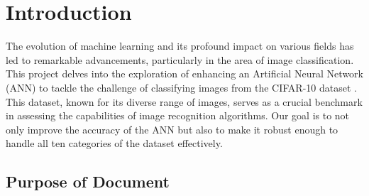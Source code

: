 \documentclass[12pt]{article}
\begin{document}


\section{Introduction}

The evolution of machine learning and its profound impact on various fields has led to remarkable advancements, 
particularly in the area of image classification. This project delves into the exploration of enhancing an 
Artificial Neural Network (ANN) to tackle the challenge of classifying images from the CIFAR-10 dataset \cite{CIFAR10}. 
This dataset, known for its diverse range of images, serves as a crucial benchmark in assessing the 
capabilities of image recognition algorithms. Our goal is to not only improve the accuracy of the ANN but 
also to make it robust enough to handle all ten categories of the dataset effectively.

\subsection{Purpose of Document}
\end{document}

